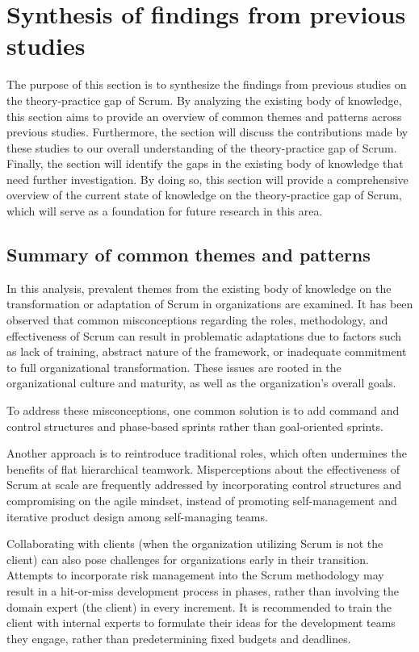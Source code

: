 \section{Synthesis of findings from previous studies}\label{sec:SynthesisPreviousStudies}
The purpose of this section is to synthesize the findings from previous studies on the theory-practice gap of Scrum. By analyzing the existing body of knowledge, this section aims to provide an overview of common themes and patterns across previous studies. Furthermore, the section will discuss the contributions made by these studies to our overall understanding of the theory-practice gap of Scrum. Finally, the section will identify the gaps in the existing body of knowledge that need further investigation. By doing so, this section will provide a comprehensive overview of the current state of knowledge on the theory-practice gap of Scrum, which will serve as a foundation for future research in this area.

\subsection*{Summary of common themes and patterns}\label{subsec:SummaryOfCommonThemes}
In this analysis, prevalent themes from the existing body of knowledge on the \gls{transformation} or \gls{adaptation} of Scrum in organizations are examined. It has been observed that common misconceptions regarding the roles, \gls{methodology}, and effectiveness of Scrum can result in problematic \glspl{adaptation} due to factors such as lack of training, abstract nature of the \gls{framework}, or inadequate \gls{commitment} to full organizational \gls{transformation}. These issues are rooted in the organizational culture and maturity, as well as the organization's overall goals.

To address these misconceptions, one common solution is to add command and control structures and phase-based sprints rather than goal-oriented sprints. 

Another approach is to reintroduce traditional roles, which often undermines the benefits of flat hierarchical teamwork. Misperceptions about the effectiveness of Scrum at scale are frequently addressed by incorporating control structures and compromising on the \gls{agile} mindset, instead of promoting self-management and iterative product design among \gls{self-managing} teams.

Collaborating with \glspl{client} (when the organization utilizing Scrum is not the \gls{client}) can also pose challenges for organizations early in their \gls{transition}. Attempts to incorporate risk management into the Scrum \gls{methodology} may result in a hit-or-miss development process in phases, rather than involving the domain expert (the \gls{client}) in every increment. It is recommended to train the \gls{client} with internal experts to formulate their ideas for the development teams they engage, rather than predetermining fixed budgets and deadlines.

